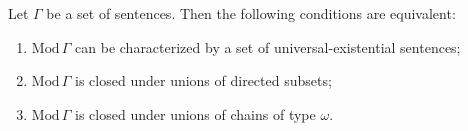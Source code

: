 Let $\Gamma$ be a set of sentences. Then the following conditions are equivalent:

\begin{enumerate}
\item[(i)] $\mathrm{Mod}\,\Gamma$ can be characterized by a set of universal-existential sentences;
\item[(ii)] $\mathrm{Mod}\,\Gamma$ is closed under unions of directed subsets;
\item[(iii)] $\mathrm{Mod}\,\Gamma$ is closed under unions of chains of type $\omega$.
\end{enumerate}
